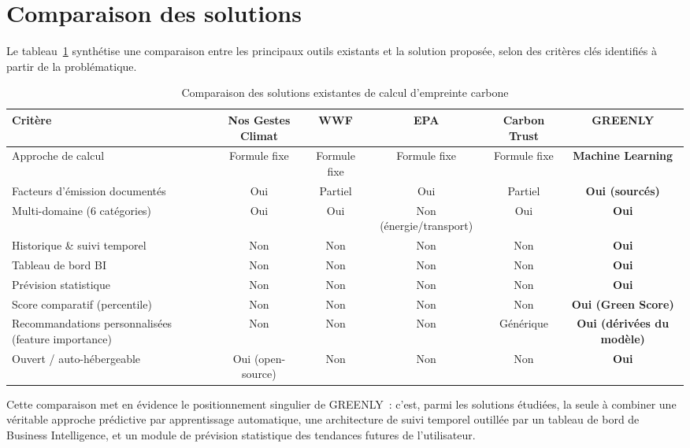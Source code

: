 \section{Comparaison des solutions}

Le tableau~\ref{tab:comparaison-solutions} synthétise une comparaison entre les principaux outils existants et la solution proposée, selon des critères clés identifiés à partir de la problématique.

\begin{table}[H]
\centering
\caption{Comparaison des solutions existantes de calcul d'empreinte carbone}
\label{tab:comparaison-solutions}
\begin{tabular}{|p{3.1cm}|c|c|c|c|c|}
\hline
\rowcolor{isiBlue!15}
\textbf{Critère} & \textbf{Nos Gestes Climat} & \textbf{WWF} & \textbf{EPA} & \textbf{Carbon Trust} & \textbf{GREENLY} \\
\hline
Approche de calcul & Formule fixe & Formule fixe & Formule fixe & Formule fixe & \textbf{Machine Learning} \\
\hline
Facteurs d'émission documentés & Oui & Partiel & Oui & Partiel & \textbf{Oui (sourcés)} \\
\hline
Multi-domaine (6 catégories) & Oui & Oui & Non (énergie/transport) & Oui & \textbf{Oui} \\
\hline
Historique \& suivi temporel & Non & Non & Non & Non & \textbf{Oui} \\
\hline
Tableau de bord BI & Non & Non & Non & Non & \textbf{Oui} \\
\hline
Prévision statistique & Non & Non & Non & Non & \textbf{Oui} \\
\hline
Score comparatif (percentile) & Non & Non & Non & Non & \textbf{Oui (Green Score)} \\
\hline
Recommandations personnalisées (feature importance) & Non & Non & Non & Générique & \textbf{Oui (dérivées du modèle)} \\
\hline
Ouvert / auto-hébergeable & Oui (open-source) & Non & Non & Non & \textbf{Oui} \\
\hline
\end{tabular}
\end{table}

Cette comparaison met en évidence le positionnement singulier de GREENLY~: c'est, parmi les solutions étudiées, la seule à combiner une véritable approche prédictive par apprentissage automatique, une architecture de suivi temporel outillée par un tableau de bord de Business Intelligence, et un module de prévision statistique des tendances futures de l'utilisateur.

